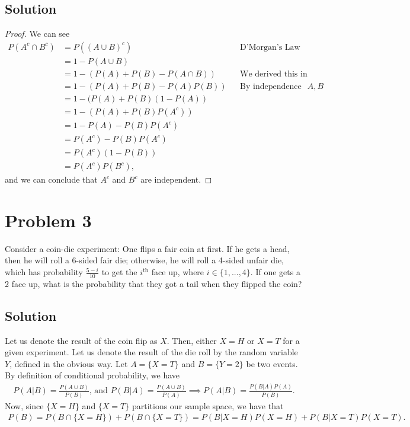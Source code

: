 \documentclass[10pt,a4paper]{article}
\theoremstyle{theorem}
\theoremstyle{definition}
\begin{document}
\subsection*{Solution}
\begin{proof}
We can see
\begin{align*}
P(A^c \cap B^c) &= P((A \cup B)^c) && \text{D'Morgan's Law}\\
&= 1 - P(A \cup B)\\
&= 1 - (P(A) + P(B) - P(A \cap B)) && \text{We derived this in class}\\
&= 1 - (P(A) + P(B) - P(A)P(B)) && \text{By independence of } A,B\\
&= 1 - (P(A) + P(B)(1-P(A))\\
&= 1 - (P(A) + P(B)P(A^c))\\
&= 1 - P(A) - P(B)P(A^c)\\
&= P(A^c) - P(B)P(A^c)\\
&= P(A^c)(1  - P(B))\\
&= P(A^c)P(B^c),
\end{align*}
and we can conclude that $A^c$ and $B^c$ are independent.
\end{proof}

\section*{Problem 3}
Consider a coin-die experiment: One flips a fair coin at first. If he gets a head, then he will
roll a 6-sided fair die; otherwise, he will roll a 4-sided unfair die, which has probability $\frac{5 - i}
{10}$ to
get the $i^\text{th}$ face up, where $i \in \{1,...,4\}$.  If one gets a 2 face up, what is the probability that they got a tail
when they flipped the coin?

\subsection*{Solution}
Let us denote the result of the coin flip as $X$.  Then, either $X = H$ or $X = T$ for a given experiment. Let us denote the result of the die roll by the random variable $Y$, defined in the obvious way. Let $A = \{X = T\}$ and $B = \{Y = 2\}$ be two events. By definition of conditional probability, we have
\begin{align*}
P(A|B) = \frac{P(A \cup B)}{P(B)} \text{, and } P(B|A) = \frac{P(A \cup B)}{P(A)} \implies P(A|B) = \frac{P(B|A) P(A)}{P(B)}.
\end{align*}
Now, since $\{X =H\}$ and $\{X = T\}$ partitions our sample space, we have that 
\begin{align*}
P(B) = P(B \cap \{X = H\}) + P(B \cap \{X = T\}) =  P(B| X = H) P(X = H) + P(B| X = T) P(X = T).
\end{align*}
\end{document}
